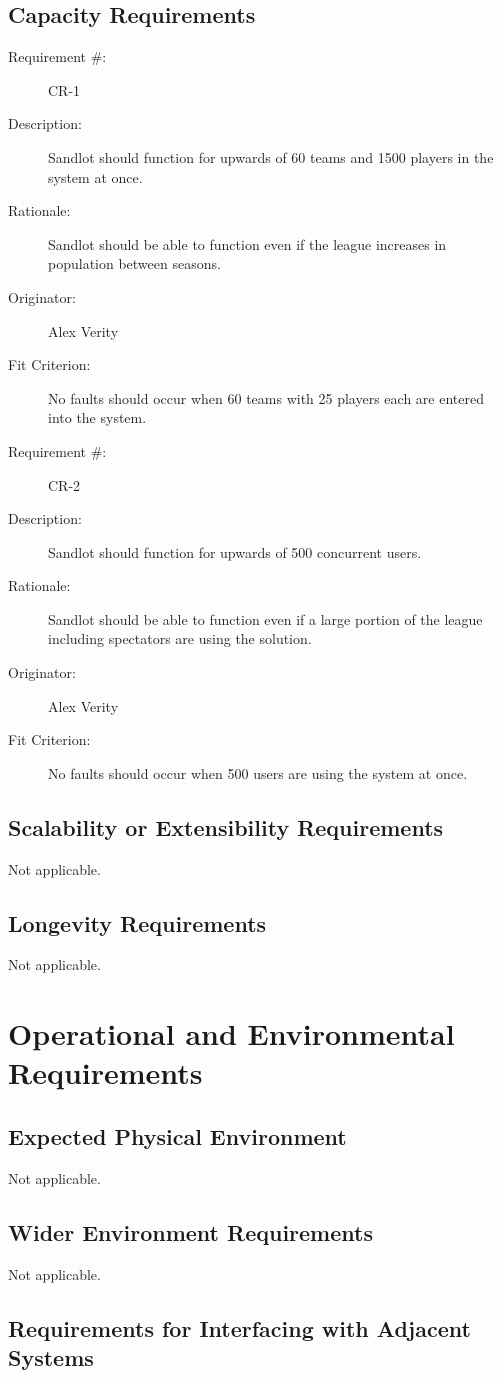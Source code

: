 \documentclass[12pt]{article}
\newenvironment{myreq}[1]{%
\setlist[description]{font=\normalfont\color{darkgray}}%
\begin{tcolorbox}[colframe=black,colback=white, sharp corners, boxrule=1pt]%
\bfseries\color{blue}%
\begin{description}#1}%
{\end{description}\end{tcolorbox}}
\newcommand{\twoinline}[2]{\begin{multicols}{2}#1 #2\end{multicols}}
\newcommand{\reqno}{\item[Requirement \#:]}
\newcommand{\reqdesc}{\item[Description:]}
\newcommand{\reqrat}{\item[Rationale:]}
\newcommand{\reqorig}{\item[Originator:]}
\newcommand{\reqfit}{\item[Fit Criterion:]}
\newcommand{\reqsatis}{\item[Customer Satisfaction:]}
\newcommand{\reqdissat}{\item[Customer Dissatisfaction:]}
\begin{document}
\subsection{Capacity Requirements}

\begin{myreq}
  \reqno CR-1
  \reqdesc Sandlot should function for upwards of 60 teams and 1500 players in
  the system at once.
  \reqrat Sandlot should be able to function even if the league increases in
  population between seasons.
  \reqorig Alex Verity
  \reqfit No faults should occur when 60 teams with 25 players each are
  entered into the system.
  \twoinline
    {\reqsatis 3}
    {\reqdissat 3}
\end{myreq}

\begin{myreq}
  \reqno CR-2
  \reqdesc Sandlot should function for upwards of 500 concurrent users.
  \reqrat Sandlot should be able to function even if a large portion of the
  league including spectators are using the solution.
  \reqorig Alex Verity
  \reqfit No faults should occur when 500 users are using the system at once.
  \twoinline
    {\reqsatis 3}
    {\reqdissat 3}
\end{myreq}

\subsection{Scalability or Extensibility Requirements}
Not applicable.
\subsection{Longevity Requirements}
Not applicable.

\section{Operational and Environmental Requirements}
\subsection{Expected Physical Environment}
Not applicable.
\subsection{Wider Environment Requirements}
Not applicable.
\subsection{Requirements for Interfacing with Adjacent Systems}
\end{document}
